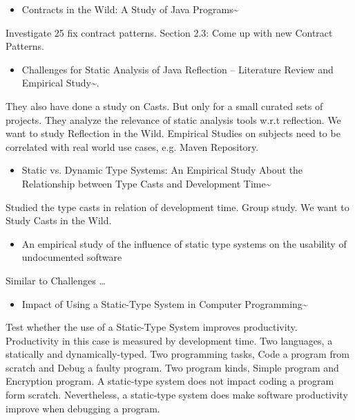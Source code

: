 \begin{itemize}
\item Contracts in the Wild: A Study of Java Programs\textasciitilde{}\cite{dietrichetal:LIPIcs:2017:7259}
\end{itemize}
Investigate 25 fix contract patterns. 
Section 2.3: Come up with new Contract Patterns. 

\begin{itemize}
\item Challenges for Static Analysis of Java Reflection -- Literature Review and Empirical Study\textasciitilde{}\cite{Landman:2017:CSA:3097368.3097429}.
\end{itemize}
They also have done a study on Casts. 
But only for a small curated sets of projects. 
They analyze the relevance of static analysis tools w.r.t reflection. 
We want to study Reflection in the Wild. 
Empirical Studies on subjects need to be correlated with real world use cases, e.g. Maven Repository. 

\begin{itemize}
\item Static vs. Dynamic Type Systems: An Empirical Study About the Relationship between Type Casts and Development Time\textasciitilde{}\cite{Stuchlik:2011:SVD:2047849.2047861}
\end{itemize}
Studied the type casts in relation of development time. 
Group study. 
We want to Study Casts in the Wild. 

\begin{itemize}
\item An empirical study of the influence of static type systems on the usability of undocumented software
\end{itemize}
\cite{Mayer:2012:ESI:2384616.2384666} 
Similar to Challenges \ldots{} 

\begin{itemize}
\item Impact of Using a Static-Type System in Computer Programming\textasciitilde{}\cite{7911881}
\end{itemize}
Test whether the use of a Static-Type System improves productivity. 
Productivity in this case is measured by development time. 
Two languages, a statically and dynamically-typed. 
Two programming tasks, Code a program from scratch and Debug a faulty program. 
Two program kinds, Simple program and Encryption program. 
A static-type system does not impact coding a program form scratch. 
Nevertheless, a static-type system does make software productivity improve when debugging a program. 

